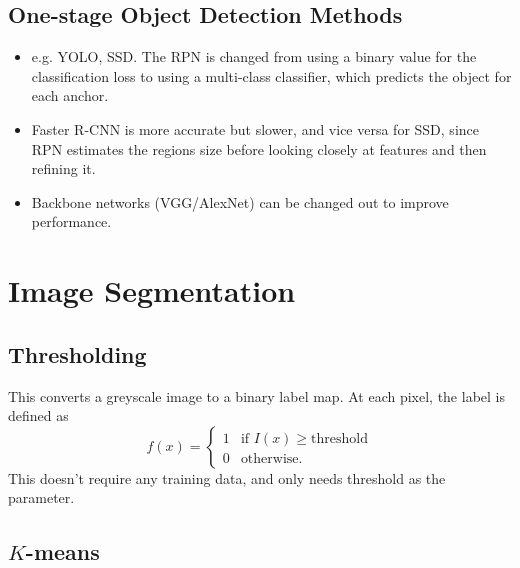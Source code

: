 \documentclass[twocolumn,landscape,10pt]{article}
\theoremstyle{definition}
\begin{document}
\subsection{One-stage Object Detection Methods}

\begin{itemize}
    \item e.g. YOLO, SSD. The RPN is changed from using a binary value for the
        classification loss to using a multi-class classifier, which predicts the object
        for each anchor.
    \item Faster R-CNN is more accurate but slower, and vice versa for SSD,
        since RPN estimates the regions size before looking closely at features
        and then refining it.
    \item Backbone networks (VGG/AlexNet) can be changed out to improve
        performance.
\end{itemize} 

\section{Image Segmentation}

\subsection{Thresholding}

This converts a greyscale image to a binary label map. At each pixel, the label
is defined as
\[
    f(x)=
    \begin{cases}
        1 & \text{if }I(x)\ge \text{threshold} \\
        0 & \text{otherwise}.
    \end{cases} 
\]
This  doesn't require any training data, and only needs threshold as the
parameter.

\subsection{$K$-means}
\end{document}
